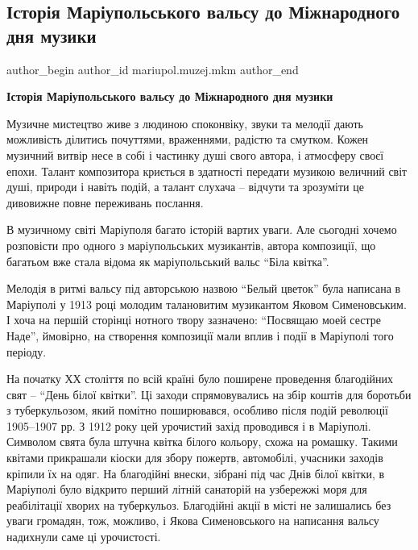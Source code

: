  
 
 
 
 

\subsection{Історія Маріупольського вальсу до Міжнародного дня музики}
\label{sec:01_10_2023.fb.mariupol.muzej.mkm.1.istoria_mrpl_vals_den_muzyky}

\ifcmt
 author_begin
   author_id mariupol.muzej.mkm
 author_end
\fi

\begin{center}
\textbf{Історія Маріупольського вальсу до Міжнародного дня музики}
\end{center}

Музичне мистецтво живе з людиною споконвіку, звуки та мелодії дають можливість
ділитись почуттями, враженнями, радістю та смутком. Кожен музичний витвір несе
в собі і частинку душі свого автора, і атмосферу своєї епохи. Талант
композитора криється в здатності передати музикою величний світ душі, природи і
навіть подій, а талант слухача – відчути та зрозуміти це дивовижне повне
переживань послання.

В музичному світі Маріуполя багато історій вартих уваги. Але сьогодні хочемо
розповісти про одного з маріупольських музикантів, автора композиції, що
багатьом вже стала відома як маріупольський вальс \enquote{Біла квітка}.

Мелодія в ритмі вальсу під авторською назвою \enquote{Белый цветок} була написана в
Маріуполі у 1913 році молодим талановитим музикантом Яковом Сименовським. І
хоча на першій сторінці нотного твору зазначено: \enquote{Посвящаю моей сестре Наде},
ймовірно, на створення композиції мали вплив і події в Маріуполі того періоду.

На початку ХХ століття по всій країні було поширене проведення благодійних свят
– \enquote{День білої квітки}. Ці заходи спрямовувались на збір коштів для боротьби з
туберкульозом, який помітно поширювався, особливо після подій революції
1905–1907 рр. З 1912 року цей урочистий захід проводився і в Маріуполі.
Символом свята була штучна квітка білого кольору, схожа на ромашку. Такими
квітами прикрашали кіоски для збору пожертв, автомобілі, учасники заходів
кріпили їх на одяг. На благодійні внески, зібрані під час Днів білої квітки, в
Маріуполі було відкрито перший літній санаторій на узбережжі моря для
реабілітації хворих на туберкульоз. Благодійні акції в місті не залишались без
уваги громадян, тож, можливо, і Якова Сименовського на написання вальсу
надихнули саме ці урочистості.

